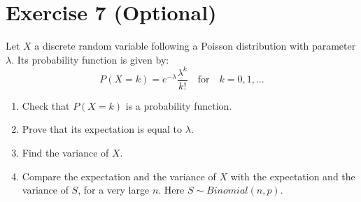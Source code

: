 \documentclass[12pt,thmsa]{article}\usepackage[]{graphicx}\usepackage[]{color}
\begin{document}
\section*{Exercise 7 (Optional)}

Let $X$ a discrete random variable following a Poisson distribution with parameter $\lambda$. Its probability function is given by:
\begin{equation*}
P(X=k)=e^{-\lambda} \frac{\lambda^{k}}{k!} \quad \text{for} \quad k=0,1,...
\end{equation*}
\begin{enumerate}
  \item Check that $P(X=k)$ is a probability function.
  \item Prove that its expectation is equal to $\lambda$.
  \item Find the variance of $X$.
  \item Compare the expectation and the variance of $X$ with the expectation and the variance of $S$, for a very large $n$. Here $S \sim Binomial(n,p)$.
\end{enumerate}
\end{document}
